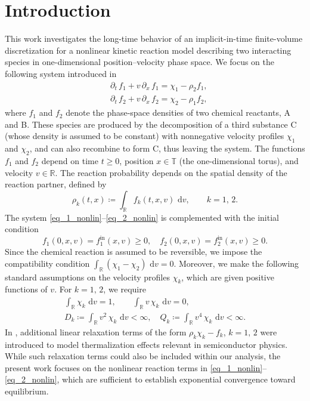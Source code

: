 \documentclass[reqno]{amsart}
\newcommand{\dt}{\,\partial_t\, }
\newcommand{\dx}{\,\partial_x\, }
\newcommand{\dd}{\,\mathrm{d}}
\newcommand{\R}{\mathbb{R}}
\newcommand{\T}{\mathbb{T}}
\newcommand{\tin}{{\mathrm{in}}}
\numberwithin{equation}{section}
\begin{document}
\maketitle

\section{Introduction}
This work investigates the long-time behavior of an implicit-in-time finite-volume discretization for a nonlinear kinetic reaction model describing two interacting species in one-dimensional position–velocity phase space. We focus on the following system introduced in~\cite{NeumannSchmeiser2016}
\begin{align}
    &\dt f_1 + v\dx f_1 = \chi_1 - \rho_2 f_1, \label{eq_1_nonlin}\\
    &\dt f_2 + v\dx f_2 = \chi_2 - \rho_1 f_2, \label{eq_2_nonlin}
\end{align}
where $f_1$ and $f_2$ denote the phase-space densities of two chemical reactants, A and B. These species are produced by the decomposition of a third substance C (whose density is assumed to be constant) with nonnegative velocity profiles $\chi_1$ and $\chi_2$, and can also recombine to form C, thus leaving the system. The functions $f_1$ and $f_2$ depend on time $t \ge 0$, position $x \in \T$ (the one-dimensional torus), and velocity $v \in \R$. The reaction probability depends on the spatial density of the reaction partner, defined by
\begin{equation}\label{def_densities}
    \rho_{k}(t,x)\coloneq\int_\R f_k(t,x,v)\,\dd v, \qquad k=1,\,2.
\end{equation}
The system \eqref{eq_1_nonlin}--\eqref{eq_2_nonlin} is complemented with the initial condition
\begin{equation}\label{CI}
    f_1(0,x,v)=f_1^\tin(x,v)\geq 0,\quad f_2(0,x,v)=f_2^\tin(x,v)\geq 0.
\end{equation}
Since the chemical reaction is assumed to be reversible, we impose the compatibility condition $\int_\R (\chi_1 -\chi_2)\,\dd v=0$. Moreover, we make the following standard assumptions on the velocity profiles $\chi_k$, which are given positive functions of $v$. For $k=1,\,2$, we require
\begin{equation}\label{hyp_chi}
    \begin{gathered}
        \int_\R \chi_k\,\dd v=1,\qquad \int_\R v\,\chi_k\,\dd v=0,\\
        D_k\coloneq\int_\R v^2\,\chi_k\,\dd v<\infty,\quad Q_k\coloneq\int_\R v^4\,\chi_k\,\dd v<\infty.
    \end{gathered}
\end{equation}
In \cite{FavrePirnerSchmeiser2023}, additional linear relaxation terms of the form $\rho_k \chi_k - f_k$, $k=1,\,2$ were introduced to model thermalization effects relevant in semiconductor physics. While such relaxation terms could also be included within our analysis, the present work focuses on the nonlinear reaction terms in \eqref{eq_1_nonlin}–\eqref{eq_2_nonlin}, which are sufficient to establish exponential convergence toward equilibrium.
\end{document}
